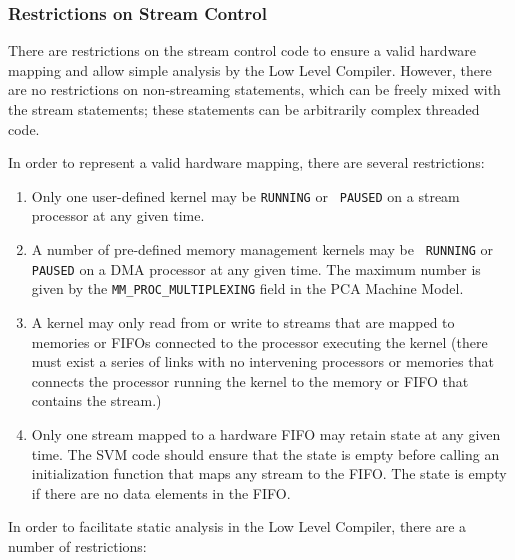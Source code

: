 \subsubsection{Restrictions on Stream Control}

There are restrictions on the stream control code to ensure a valid
hardware mapping and allow simple analysis by the Low Level
Compiler. However, there are no restrictions on non-streaming
statements, which can be freely mixed with the stream statements;
these statements can be arbitrarily complex threaded code.

In order to represent a valid hardware mapping, there are several restrictions:

\renewcommand{\labelenumi}{A\theenumi.}

\begin{enumerate}

\item Only one user-defined kernel may be {\tt RUNNING} or {\tt
PAUSED} on a stream processor at any given time.

\item A number of pre-defined memory management kernels may be {\tt
RUNNING} or {\tt PAUSED} on a DMA processor at any given time.  The
maximum number is given by the {\tt MM\_PROC\_MULTIPLEXING} field in
the PCA Machine Model.

\item A kernel may only read from or write to streams that are mapped
to memories or FIFOs connected to the processor executing the kernel
(there must exist a series of links with no intervening processors or
memories that connects the processor running the kernel to the memory
or FIFO that contains the stream.)

\item Only one stream mapped to a hardware FIFO may retain state at
any given time. The SVM code should ensure that the state is empty
before calling an initialization function that maps any stream to the
FIFO.  The state is empty if there are no data elements in the FIFO.

\end{enumerate}

\noindent In order to facilitate static analysis in the Low Level
Compiler, there are a number of restrictions:

\renewcommand{\labelenumi}{B\theenumi.}

